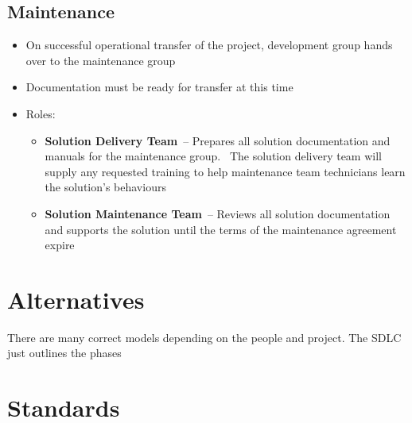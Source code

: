 \documentclass{article}[18pt]
\begin{document}
\subsection{Maintenance}
\begin{itemize}
	\item On successful operational transfer of the project, development group hands over to the maintenance group
	\item Documentation must be ready for transfer at this time
	\item Roles:
	\begin{itemize}
		\item \textbf{Solution Delivery Team} – Prepares all solution documentation 
		and manuals for the maintenance group.  The solution delivery 
		team will supply any requested training to help maintenance 
		team technicians learn the solution’s behaviours
		\item \textbf{Solution Maintenance Team} – Reviews all solution 
		documentation and supports the solution until the terms 
		of the maintenance agreement expire
	\end{itemize}
\end{itemize}
\section{Alternatives}
There are many correct models depending on the people and project. The SDLC just outlines the phases
\section{Standards}
\end{document}
